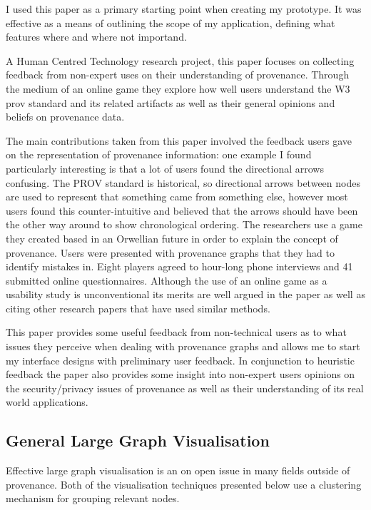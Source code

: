 I used this paper as a primary starting point when creating my prototype. It was effective as a means of outlining the scope of my application, defining what features where and where not importand.


A Human Centred Technology research project, this paper focuses on collecting feedback from non-expert uses on their understanding of provenance. Through the medium of an online game they explore how well users understand the W3 prov standard\cite{primer2013} and its related artifacts as well as their general opinions and beliefs on provenance data.

The main contributions taken from this paper involved the feedback users gave on the representation of provenance information: one example I found particularly interesting is that a lot of users found the directional arrows confusing. The PROV standard is historical, so directional arrows between nodes are used to represent that something came from something else, however most users found this counter-intuitive and believed that the arrows should have been the other way around to show chronological ordering. The researchers use a game they created based in an Orwellian future in order to explain the concept of provenance. Users were presented with provenance graphs that they had to identify mistakes in. Eight players agreed to hour-long phone interviews and 41 submitted online questionnaires. Although the use of an online game as a usability study is unconventional its merits are well argued in the paper as well as citing other research papers that have used similar methods.

This paper provides some useful feedback from non-technical users as to what issues they perceive when dealing with provenance graphs and allows me to start my interface designs with preliminary user feedback. In conjunction to heuristic feedback the paper also provides some insight into non-expert users opinions on the security/privacy issues of provenance as well as their understanding of its real world applications.

\subsection{General Large Graph Visualisation}
\label{sub:large_graph_visualisation}

Effective large graph visualisation is an on open issue in many fields outside of provenance. Both of the visualisation techniques presented below use a clustering mechanism for grouping relevant nodes. 

